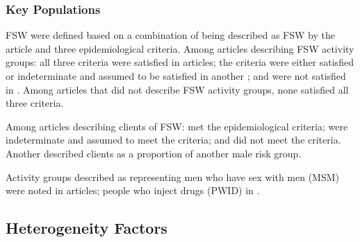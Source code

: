 \subsubsection{Key Populations}
\label{sss:res:kp}
FSW were defined based on a combination of  %
being described as FSW by the article and three epidemiological criteria.
Among  articles describing FSW activity groups:
all three criteria were satisfied in  articles;  %
the criteria were either satisfied or indeterminate and assumed to be satisfied
in another ;
and were not satisfied in .
Among articles that did not describe FSW activity groups,
none satisfied all three criteria.  %
\par
Among  articles describing clients of FSW:
 met the epidemiological criteria;
 were indeterminate and assumed to meet the criteria; and
 did not meet the criteria.
Another  described clients as a proportion of another male risk group.
\par
Activity groups described as representing
men who have sex with men (MSM) were noted in  articles;
people who inject drugs (PWID) in .
\subsection{Heterogeneity Factors}
\label{ss:res:factors}
